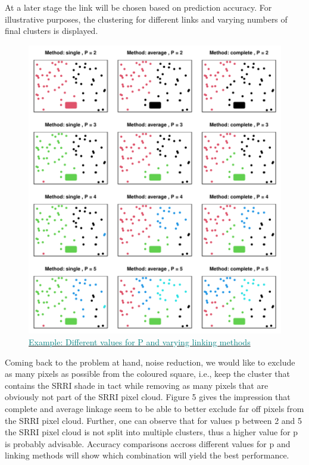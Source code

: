 \documentclass[aodsor,preprint]{imsart}
\numberwithin{equation}{section}
\theoremstyle{plain}
\begin{document}
At a later stage the link will be chosen based on prediction accuracy. For illustrative purposes, the clustering for different links and varying numbers of final clusters is displayed.\newpage

\begin{figure}[H]
	\includegraphics[width = 12cm]{methodsclust.pdf}
	\caption{\href{https://github.com/Base-R-Best-R/KID/blob/main/Code/Tests/Shade_ext.pdf}{\textcolor{teal}{Example: Different values for P and varying linking methods}}}
	\label{fig5}
\end{figure}

Coming back to the problem at hand, noise reduction, we would like to exclude as many pixels as possible from the coloured square, i.e., keep the cluster that contains the SRRI shade in tact while removing as many pixels that are obviously not part of the SRRI pixel cloud. Figure 5 gives the impression that complete and average linkage seem to be able to better exclude far off pixels from the SRRI pixel cloud. Further, one can observe that for values p between 2 and 5 the SRRI pixel cloud is not split into multiple clusters, thus a higher value for p is probably advisable. Accuracy comparisons accross different values for p and linking methods will show which combination will yield the best performance.\newpage
\end{document}
